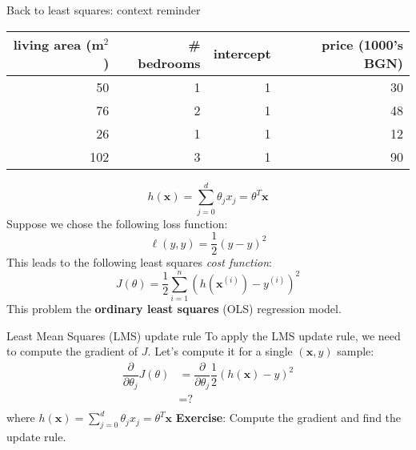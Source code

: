 \documentclass{beamer}
\newcommand{\yhat}{\hat{y}}
\newcommand{\bxi}{\bm{x}^{(i)}}
\newcommand{\bx}{\bm{x}}
\newcommand{\yi}{y^{(i)}}
\newcommand{\1}[1]{\mathbbm{1}\left[#1\right]}
\begin{document}
\begin{frame}{Back to least squares: context reminder}
\begin{table}
\centering
\begin{tabular}{r|r|r|r}
living area (m$^2$) & \# bedrooms & intercept & price (1000's BGN) \\\hline
50 & 1 & 1 & 30\\
76 & 2 & 1 & 48\\
26 & 1 & 1 & 12\\
102 & 3 & 1 & 90\\
\end{tabular}
\end{table}
\vfill
\begin{equation*}
h(\bx) = \sum_{j = 0}^{d} \theta_j x_j = \theta^T \bx
\end{equation*}
\pause
\vfill
Suppose we chose the following loss function:
\begin{equation*}
\ell \left( y, \yhat \right) = \dfrac{1}{2} \left( y - \yhat \right)^2
\end{equation*}
This leads to the following least squares \textit{cost function}:
\begin{equation*}
J(\theta) = \dfrac{1}{2} \sum_{i = 1}^{n} \left( h\left(\bxi\right) - \yi \right)^2
\end{equation*}
This problem the \textbf{ordinary least squares} (OLS) regression model.
\end{frame}

\begin{frame}{Least Mean Squares (LMS) update rule}
To apply the LMS update rule, we need to compute the gradient of $J$. Let's compute it for a single $(\bx, y)$ sample:
\begin{equation*}
\begin{split}
\dfrac{\partial}{\partial \theta_j} J(\theta) & = \dfrac{\partial}{\partial \theta_j} \dfrac{1}{2} \left( h\left(\bx\right) - y \right)^2 \\ 
 & = \text{?} \\
\end{split}
\end{equation*}
where $h(\bx) = \sum_{j = 0}^{d} \theta_j x_j = \theta^T \bx$
\vfill
\pause
\textbf{Exercise}: Compute the gradient and find the update rule.
\end{frame}
\end{document}
